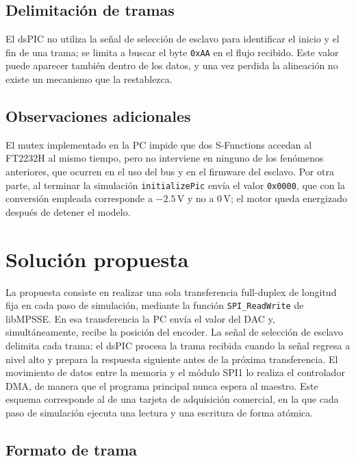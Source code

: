 \documentclass[11pt]{article}
\newcommand{\code}[1]{\texttt{#1}}
\begin{document}
\subsection{Delimitación de tramas}

El dsPIC no utiliza la señal de selección de esclavo para identificar el
inicio y el fin de una trama; se limita a buscar el byte \code{0xAA} en el
flujo recibido. Este valor puede aparecer también dentro de los datos, y una
vez perdida la alineación no existe un mecanismo que la restablezca.

\subsection{Observaciones adicionales}

El mutex implementado en la PC impide que dos S-Functions accedan al FT2232H
al mismo tiempo, pero no interviene en ninguno de los fenómenos anteriores,
que ocurren en el uso del bus y en el firmware del esclavo. Por otra parte, al
terminar la simulación \code{initializePic} envía el valor \code{0x0000}, que
con la conversión empleada corresponde a $-2.5$\,V y no a 0\,V; el motor queda
energizado después de detener el modelo.

\section{Solución propuesta}

La propuesta consiste en realizar una sola transferencia full-duplex de
longitud fija en cada paso de simulación, mediante la función
\code{SPI\_ReadWrite} de libMPSSE. En esa transferencia la PC envía el valor
del DAC y, simultáneamente, recibe la posición del encoder. La señal de
selección de esclavo delimita cada trama: el dsPIC procesa la trama recibida
cuando la señal regresa a nivel alto y prepara la respuesta siguiente antes de
la próxima transferencia. El movimiento de datos entre la memoria y el módulo
SPI1 lo realiza el controlador DMA, de manera que el programa principal nunca
espera al maestro. Este esquema corresponde al de una tarjeta de adquisición
comercial, en la que cada paso de simulación ejecuta una lectura y una
escritura de forma atómica.

\subsection{Formato de trama}
\end{document}
